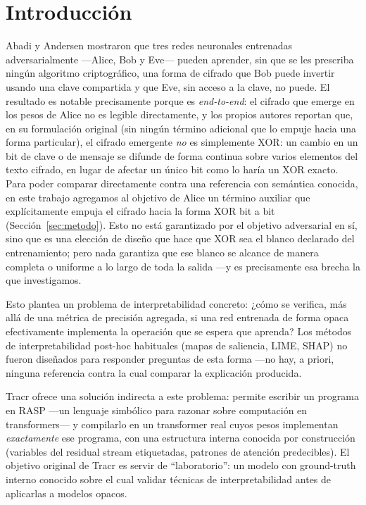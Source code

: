 \documentclass[manuscript,screen]{acmart}
\begin{document}

\maketitle

\section{Introducción}

Abadi y Andersen \citep{abadi2016learning} mostraron que tres redes neuronales entrenadas
adversarialmente —Alice, Bob y Eve— pueden aprender, sin que se les prescriba ningún algoritmo
criptográfico, una forma de cifrado que Bob puede invertir usando una clave compartida y que
Eve, sin acceso a la clave, no puede. El resultado es notable precisamente porque es
\emph{end-to-end}: el cifrado que emerge en los pesos de Alice no es legible directamente, y
los propios autores reportan que, en su formulación original (sin ningún término adicional que
lo empuje hacia una forma particular), el cifrado emergente \emph{no} es simplemente XOR: un
cambio en un bit de clave o de mensaje se difunde de forma continua sobre varios elementos del
texto cifrado, en lugar de afectar un único bit como lo haría un XOR exacto. Para poder comparar directamente contra una referencia con semántica conocida, en este trabajo
agregamos al objetivo de Alice un término auxiliar que explícitamente empuja el cifrado hacia la
forma XOR bit a bit (Sección~\ref{sec:metodo}). Esto no está garantizado por el objetivo
adversarial en sí, sino que es una elección de diseño que hace que XOR sea el blanco declarado
del entrenamiento; pero nada garantiza que ese blanco se alcance de manera completa o uniforme a
lo largo de toda la salida —y es precisamente esa brecha la que investigamos.

Esto plantea un problema de interpretabilidad concreto: ¿cómo se verifica, más allá de una
métrica de precisión agregada, si una red entrenada de forma opaca efectivamente implementa la
operación que se espera que aprenda? Los métodos de interpretabilidad post-hoc habituales
(mapas de saliencia, LIME, SHAP) no fueron diseñados para responder preguntas de esta forma —no
hay, a priori, ninguna referencia contra la cual comparar la explicación producida.

Tracr \citep{lindner2023tracr} ofrece una solución indirecta a este problema: permite escribir
un programa en RASP \citep{weiss2021thinking} —un lenguaje simbólico para razonar sobre
computación en transformers— y compilarlo en un transformer real cuyos pesos implementan
\emph{exactamente} ese programa, con una estructura interna conocida por construcción (variables
del residual stream etiquetadas, patrones de atención predecibles). El objetivo original de
Tracr es servir de ``laboratorio'': un modelo con ground-truth interno conocido sobre el cual
validar técnicas de interpretabilidad antes de aplicarlas a modelos opacos.
\end{document}
